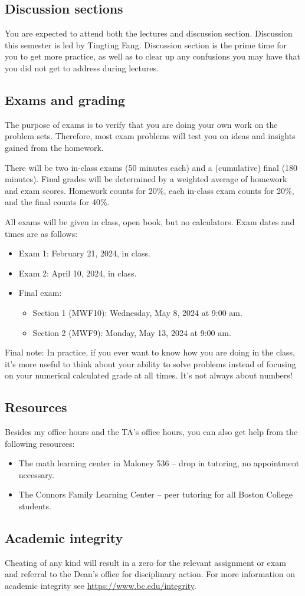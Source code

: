 \documentclass[11pt,oneside]{amsart}
\begin{document}
\subsection*{Discussion sections}
You are expected to attend both the lectures and discussion section. Discussion this semester is led by Tingting Fang. Discussion section is the prime time for you to get more practice, as well as to clear up any confusions you may have that you did not get to address during lectures.

\subsection*{Exams and grading}
The purpose of exams is to verify that you are doing your own work on the problem sets. Therefore, most exam problems will test you on ideas and insights gained from the homework.

There will be two in-class exams (50 minutes each) and a (cumulative) final (180 minutes). Final grades will be determined by a weighted average of homework and exam scores.  Homework counts for 20\%, each in-class exam counts for 20\%, and the final counts for 40\%.

All exams will be given in class, open book, but no calculators. Exam dates and times are as follows:
\begin{itemize}
  \item Exam 1: February 21, 2024, in class.
  \item Exam 2: April 10, 2024, in class.
  \item Final exam:
  \begin{itemize}
    \item Section 1 (MWF10): Wednesday, May 8, 2024 at 9:00 am.
    \item Section 2 (MWF9): Monday, May 13, 2024 at 9:00 am.
  \end{itemize}
\end{itemize}
Final note: In practice, if you ever want to know how you are doing in the class, it's more useful to think about your ability to solve problems instead of focusing on your numerical calculated grade at all times. It's not always about numbers!

\subsection*{Resources}
Besides my office hours and the TA's office hours, you can also get help from the following resources:
\begin{itemize}
    \item The math learning center in Maloney 536 -- drop in tutoring, no appointment necessary.
    \item The Connors Family Learning Center -- peer tutoring for all Boston College students.
\end{itemize}

\subsection*{Academic integrity}
Cheating of any kind will result in a zero for the relevant assignment or exam and referral to the Dean’s office for disciplinary action.  For more information on academic integrity see \url{https://www.bc.edu/integrity}.
\end{document}
